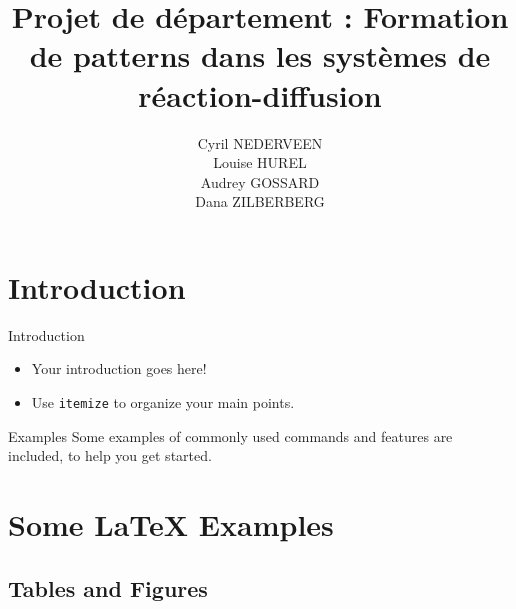 \documentclass{beamer}
\title[Your Short Title]{Projet de département  : Formation de patterns dans les systèmes de réaction-diffusion}
\author{Cyril NEDERVEEN\\
Louise HUREL\\
Audrey GOSSARD\\
Dana ZILBERBERG}
\institute{Ecole des Ponts Paristech}
\begin{document}
\begin{frame}
  \titlepage
\end{frame}


\section{Introduction}

\begin{frame}{Introduction}

\begin{itemize}
  \item Your introduction goes here!
  \item Use \texttt{itemize} to organize your main points.
\end{itemize}

\vskip 1cm

\begin{block}{Examples}
Some examples of commonly used commands and features are included, to help you get started.
\end{block}

\end{frame}

\section{Some \LaTeX{} Examples}

\subsection{Tables and Figures}
\end{document}
